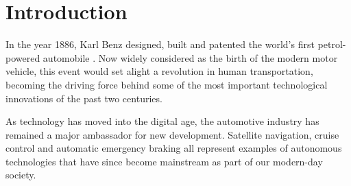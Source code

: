 \documentclass[conference]{IEEEtran}
\begin{document}




%
\IEEEpeerreviewmaketitle


\section{Introduction}

In the year 1886, Karl Benz designed, built and patented the world's first petrol-powered automobile \cite{karl-benz}. Now widely considered as the birth of the modern motor vehicle, this event would set alight a revolution in human transportation, becoming the driving force behind some of the most important technological innovations of the past two centuries. 



As technology has moved into the digital age, the automotive industry has remained a major ambassador for new development. Satellite navigation, cruise control and automatic emergency braking all represent examples of autonomous technologies that have since become mainstream as part of our modern-day society. 
\end{document}
